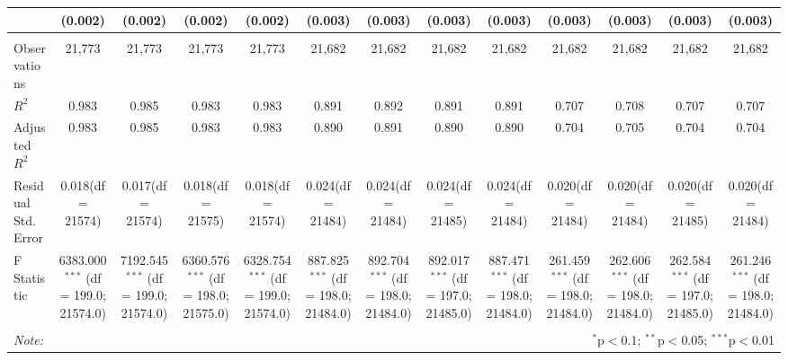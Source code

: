 \begin{table}[!htbp]
\begin{tabular}{@{\extracolsep{5pt}}lcccccccccccc}
  & (0.002) & (0.002) & (0.002) & (0.002) & (0.003) & (0.003) & (0.003) & (0.003) & (0.003) & (0.003) & (0.003) & (0.003) \\
\hline \\[-1.8ex]
 Observations & 21,773 & 21,773 & 21,773 & 21,773 & 21,682 & 21,682 & 21,682 & 21,682 & 21,682 & 21,682 & 21,682 & 21,682 \\
 $R^2$ & 0.983 & 0.985 & 0.983 & 0.983 & 0.891 & 0.892 & 0.891 & 0.891 & 0.707 & 0.708 & 0.707 & 0.707 \\
 Adjusted $R^2$ & 0.983 & 0.985 & 0.983 & 0.983 & 0.890 & 0.891 & 0.890 & 0.890 & 0.704 & 0.705 & 0.704 & 0.704 \\
 Residual Std. Error & 0.018(df = 21574) & 0.017(df = 21574) & 0.018(df = 21575) & 0.018(df = 21574) & 0.024(df = 21484) & 0.024(df = 21484) & 0.024(df = 21485) & 0.024(df = 21484) & 0.020(df = 21484) & 0.020(df = 21484) & 0.020(df = 21485) & 0.020(df = 21484)  \\
 F Statistic & 6383.000$^{***}$ (df = 199.0; 21574.0) & 7192.545$^{***}$ (df = 199.0; 21574.0) & 6360.576$^{***}$ (df = 198.0; 21575.0) & 6328.754$^{***}$ (df = 199.0; 21574.0) & 887.825$^{***}$ (df = 198.0; 21484.0) & 892.704$^{***}$ (df = 198.0; 21484.0) & 892.017$^{***}$ (df = 197.0; 21485.0) & 887.471$^{***}$ (df = 198.0; 21484.0) & 261.459$^{***}$ (df = 198.0; 21484.0) & 262.606$^{***}$ (df = 198.0; 21484.0) & 262.584$^{***}$ (df = 197.0; 21485.0) & 261.246$^{***}$ (df = 198.0; 21484.0) \\
\hline
\hline \\[-1.8ex]
\textit{Note:} & \multicolumn{12}{r}{$^{*}$p$<$0.1; $^{**}$p$<$0.05; $^{***}$p$<$0.01} \\
\end{tabular}
\end{table}